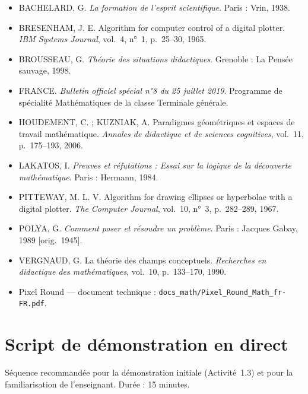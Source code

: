 \documentclass[12pt,a4paper]{scrartcl}
\begin{document}
\begin{itemize}[leftmargin=1.3em,itemsep=0.2em,topsep=0.3em]
  \item BACHELARD, G. \emph{La formation de l'esprit scientifique}. Paris : Vrin, 1938.
  \item BRESENHAM, J. E. Algorithm for computer control of a digital plotter. \emph{IBM Systems Journal}, vol.~4, n°~1, p.~25--30, 1965.
  \item BROUSSEAU, G. \emph{Théorie des situations didactiques}. Grenoble : La Pensée sauvage, 1998.
  \item FRANCE. \emph{Bulletin officiel spécial n°8 du 25 juillet 2019}. Programme de spécialité Mathématiques de la classe Terminale générale.
  \item HOUDEMENT, C. ; KUZNIAK, A. Paradigmes géométriques et espaces de travail mathématique. \emph{Annales de didactique et de sciences cognitives}, vol.~11, p.~175--193, 2006.
  \item LAKATOS, I. \emph{Preuves et réfutations : Essai sur la logique de la découverte mathématique}. Paris : Hermann, 1984.
  \item PITTEWAY, M. L. V. Algorithm for drawing ellipses or hyperbolae with a digital plotter. \emph{The Computer Journal}, vol.~10, n°~3, p.~282--289, 1967.
  \item POLYA, G. \emph{Comment poser et résoudre un problème}. Paris : Jacques Gabay, 1989 [orig.~1945].
  \item VERGNAUD, G. La théorie des champs conceptuels. \emph{Recherches en didactique des mathématiques}, vol.~10, p.~133--170, 1990.
  \item Pixel Round --- document technique : \texttt{docs\_math/Pixel\_Round\_Math\_fr-FR.pdf}.
\end{itemize}

\newpage
\appendix
\renewcommand{\thesection}{\Alph{section}}
\setcounter{section}{0}

\section{Script de démonstration en direct}\label{ap:script}

Séquence recommandée pour la démonstration initiale (Activité~1.3) et pour la familiarisation de l'enseignant. Durée : 15 minutes.
\end{document}

